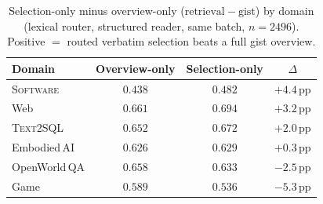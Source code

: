 \documentclass{article} %
\newcommand{\pp}{\,\mathrm{pp}}
\begin{document}
\begin{table}[h]
\centering
\caption{Selection-only minus overview-only ($\mathrm{retrieval}-\mathrm{gist}$) by
domain (lexical router, structured reader, same batch, $n{=}2496$). Positive $=$ routed
verbatim selection beats a full gist overview.}
\label{tab:assemblydom}
\small
\begin{tabular}{lccc}
\toprule
Domain & Overview-only & Selection-only & $\Delta$ \\
\midrule
\textsc{Software}   & $0.438$ & $0.482$ & $+4.4\pp$ \\
Web                 & $0.661$ & $0.694$ & $+3.2\pp$ \\
\textsc{Text2SQL}   & $0.652$ & $0.672$ & $+2.0\pp$ \\
Embodied\,AI        & $0.626$ & $0.629$ & $+0.3\pp$ \\
OpenWorld\,QA       & $0.658$ & $0.633$ & $-2.5\pp$ \\
Game                & $0.589$ & $0.536$ & $-5.3\pp$ \\
\bottomrule
\end{tabular}
\end{table}
\end{document}
